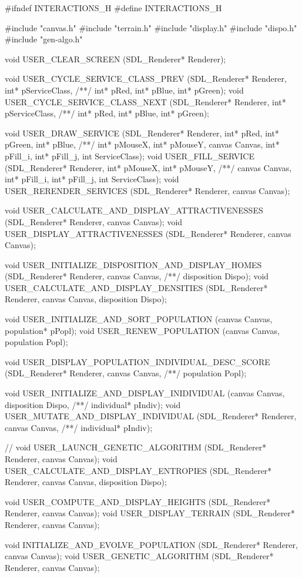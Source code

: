 \begin{C}
#ifndef INTERACTIONS_H
#define INTERACTIONS_H

#include "canvas.h"
#include "terrain.h"
#include "display.h"
#include "dispo.h"
#include "gen-algo.h"

void USER_CLEAR_SCREEN (SDL_Renderer* Renderer);

void USER_CYCLE_SERVICE_CLASS_PREV (SDL_Renderer* Renderer, int* pServiceClass,
/**/ int* pRed, int* pBlue, int* pGreen);
void USER_CYCLE_SERVICE_CLASS_NEXT (SDL_Renderer* Renderer, int* pServiceClass,
/**/ int* pRed, int* pBlue, int* pGreen);

void USER_DRAW_SERVICE (SDL_Renderer* Renderer, int* pRed, int* pGreen, int* pBlue,
/**/ int* pMouseX, int* pMouseY, canvas Canvas, int* pFill_i, int* pFill_j, int ServiceClass);
void USER_FILL_SERVICE (SDL_Renderer* Renderer, int* pMouseX, int* pMouseY,
/**/ canvas Canvas, int* pFill_i, int* pFill_j, int ServiceClass);
void USER_RERENDER_SERVICES (SDL_Renderer* Renderer, canvas Canvas);


void USER_CALCULATE_AND_DISPLAY_ATTRACTIVENESSES (SDL_Renderer* Renderer, canvas Canvas);
void USER_DISPLAY_ATTRACTIVENESSES (SDL_Renderer* Renderer, canvas Canvas);

void USER_INITIALIZE_DISPOSITION_AND_DISPLAY_HOMES (SDL_Renderer* Renderer, canvas Canvas,
/**/ disposition Dispo);
void USER_CALCULATE_AND_DISPLAY_DENSITIES (SDL_Renderer* Renderer, canvas Canvas, disposition Dispo);

void USER_INITIALIZE_AND_SORT_POPULATION (canvas Canvas, population* pPopl);
void USER_RENEW_POPULATION (canvas Canvas, population Popl);

void USER_DISPLAY_POPULATION_INDIVIDUAL_DESC_SCORE (SDL_Renderer* Renderer, canvas Canvas,
/**/ population Popl);

void USER_INITIALIZE_AND_DISPLAY_INIDIVIDUAL (canvas Canvas, disposition Dispo,
/**/ individual* pIndiv);
void USER_MUTATE_AND_DISPLAY_INDIVIDUAL (SDL_Renderer* Renderer, canvas Canvas,
/**/ individual* pIndiv);

// void USER_LAUNCH_GENETIC_ALGORITHM (SDL_Renderer* Renderer, canvas Canvas);
void USER_CALCULATE_AND_DISPLAY_ENTROPIES (SDL_Renderer* Renderer, canvas Canvas, disposition Dispo);




void USER_COMPUTE_AND_DISPLAY_HEIGHTS (SDL_Renderer* Renderer, canvas Canvas);
void USER_DISPLAY_TERRAIN (SDL_Renderer* Renderer, canvas Canvas);


void INITIALIZE_AND_EVOLVE_POPULATION (SDL_Renderer* Renderer, canvas Canvas);
void USER_GENETIC_ALGORITHM (SDL_Renderer* Renderer, canvas	Canvas);




\end{C}
